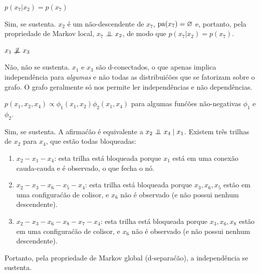 \begin{exenumerate}
    \item $p(x_7 | x_2) = p(x_7)$
    
    \begin{solution}
        Sim, se sustenta. $x_2$ \'e um n\~ao-descendente de $x_7$,
        $\mathrm{pa}(x_7)=\varnothing$ e, portanto, pela propriedade de Markov local, $x_7$
        $\mathrel{\perp\mspace{-10mu}\perp} x_2$, de modo que $p(x_7 | x_2) = p(x_7)$.
    \end{solution}
    
    \item $x_1 \notind x_3$  
    
    \begin{solution}
        N\~ao, n\~ao se sustenta. $x_1$ e $x_3$ s\~ao d-conectados, o que apenas implica independ\^encia para \emph{algumas} e n\~ao todas as distribui\'c\~oes que se fatorizam sobre o grafo. O grafo geralmente s\'o nos permite ler independ\^encias e n\~ao depend\^encias.
        
    \end{solution}
    
    
    \item $p(x_1,x_2,x_4) \propto \phi_1(x_1,x_2) \phi_2(x_1,x_4)$ para algumas fun\'c\~oes n\~ao-negativas $\phi_1$ e $\phi_2$. 
    
    \begin{solution}
        Sim, se sustenta. A afirma\'c\~ao \'e equivalente a $x_2 \mathrel{\perp\mspace{-10mu}\perp} x_4 \mid x_1$. Existem tr\^es trilhas de $x_2$ para $x_4$, que est\~ao todas bloqueadas:
        \begin{enumerate}
            \item $x_2-x_1-x_4$: esta trilha est\'a bloqueada porque $x_1$ est\'a em uma conex\~ao cauda-cauda e \'e observado, o que fecha o n\'o.
            \item $x_2-x_3-x_6-x_5-x_4$: esta trilha est\'a bloqueada porque
            $x_3, x_6, x_5$ est\~ao em uma configura\'c\~ao de colisor, e $x_6$
            n\~ao \'e observado (e n\~ao possui nenhum descendente).
            \item $x_2-x_3-x_6- x_8- x_7- x_4$: esta trilha est\'a bloqueada porque
            $x_3, x_6, x_8$ est\~ao em uma configura\'c\~ao de colisor, e $x_6$
            n\~ao \'e observado (e n\~ao possui nenhum descendente).
        \end{enumerate}
        Portanto, pela propriedade de Markov global (d-separa\'c\~ao), a independ\^encia se sustenta.
    \end{solution}
    

\end{exenumerate}
